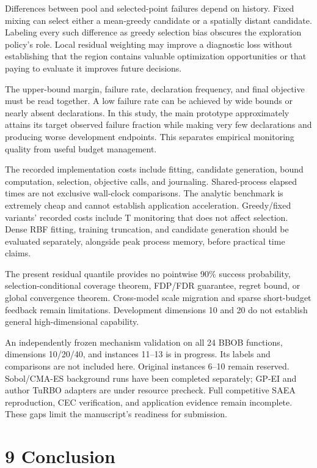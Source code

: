 \documentclass[11pt,a4paper]{article}
\begin{document}
Differences between pool and selected-point failures depend on history.
Fixed mixing can select either a mean-greedy candidate or a spatially
distant candidate. Labeling every such difference as greedy selection
bias obscures the exploration policy's role. Local residual weighting
may improve a diagnostic loss without establishing that the region
contains valuable optimization opportunities or that paying to evaluate
it improves future decisions.

The upper-bound margin, failure rate, declaration frequency, and final
objective must be read together. A low failure rate can be achieved by
wide bounds or nearly absent declarations. In this study, the main
prototype approximately attains its target observed failure fraction
while making very few declarations and producing worse development
endpoints. This separates empirical monitoring quality from useful
budget management.

The recorded implementation costs include fitting, candidate generation,
bound computation, selection, objective calls, and journaling.
Shared-process elapsed times are not exclusive wall-clock comparisons.
The analytic benchmark is extremely cheap and cannot establish
application acceleration. Greedy/fixed variants' recorded costs include
T monitoring that does not affect selection. Dense RBF fitting, training
truncation, and candidate generation should be evaluated separately,
alongside peak process memory, before practical time claims.

The present residual quantile provides no pointwise 90\% success
probability, selection-conditional coverage theorem, FDP/FDR guarantee,
regret bound, or global convergence theorem. Cross-model scale migration
and sparse short-budget feedback remain limitations. Development
dimensions 10 and 20 do not establish general high-dimensional
capability.

An independently frozen mechanism validation on all 24 BBOB functions,
dimensions 10/20/40, and instances 11--13 is in progress. Its labels and
comparisons are not included here. Original instances 6--10 remain
reserved. Sobol/CMA-ES background runs have been completed separately;
GP-EI and author TuRBO adapters are under resource precheck. Full
competitive SAEA reproduction, CEC verification, and application
evidence remain incomplete. These gaps limit the manuscript's readiness
for submission.

\hypertarget{conclusion}{%
\section{9 Conclusion}\label{conclusion}}
\end{document}
